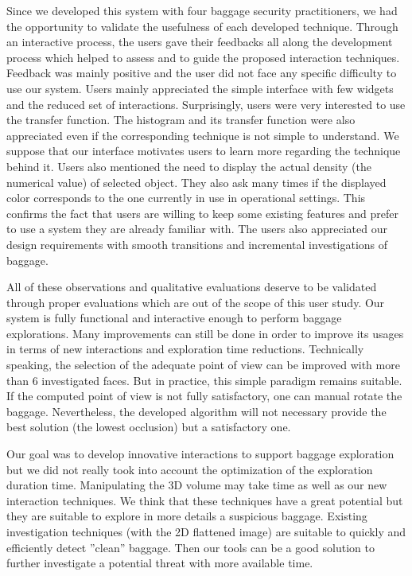 Since we developed this system with four baggage security practitioners, we had the opportunity to validate the usefulness of each developed technique. Through an interactive process, the users gave their feedbacks all along the development process which helped to assess and to guide the proposed interaction techniques. Feedback was mainly positive and the user did not face any specific difficulty to use our system. Users mainly appreciated the simple interface with few widgets and the reduced set of interactions. Surprisingly, users were very interested to use the transfer function. The histogram and its transfer function were also appreciated even if the corresponding technique is not simple to understand. We suppose that our interface motivates users to learn more regarding the technique behind it. Users also mentioned the need to display the actual density (the numerical value) of selected object. They also ask many times if the displayed color corresponds to the one currently in use in operational settings. This confirms the fact that users are willing to keep some existing features and prefer to use a system they are already familiar with.
The users also appreciated our design requirements with smooth transitions and incremental investigations of baggage.
\par All of these observations and qualitative evaluations deserve to be validated through proper evaluations which are out of the scope of this user study.
Our system is fully functional and interactive enough to perform baggage explorations. Many improvements can still be done in order to improve its usages in terms of new interactions and exploration time reductions.
Technically speaking, the selection of the adequate point of view can be improved with more than 6 investigated faces. But in practice, this simple paradigm remains suitable. If the computed point of view is not fully satisfactory, one can manual rotate the baggage. Nevertheless, the developed algorithm will not necessary provide the best solution (the lowest occlusion) but a satisfactory one.
\par Our goal was to develop
innovative interactions to support baggage exploration but we did not really took into account the optimization of the exploration duration time. Manipulating the 3D volume may take time as well as our new interaction techniques. We think that these techniques have a great potential but they are suitable to explore in more details a suspicious baggage. Existing investigation techniques (with the 2D flattened image) are suitable to quickly and efficiently detect ''clean'' baggage. Then our tools can be a good solution to further investigate a potential threat with more available time.